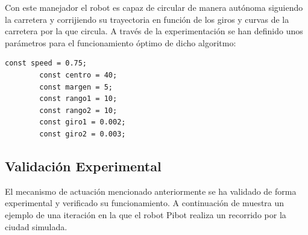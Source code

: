 \documentclass{report}
\begin{document}
Con este manejador el robot es capaz de circular de manera autónoma siguiendo la carretera y corrijiendo su trayectoria en función de los giros y curvas de la carretera por la que circula. A través de la experimentación se han definido unos parámetros para el funcionamiento óptimo de dicho algoritmo:

\begin{lstlisting}[backgroundcolor = \color{light-gray},
				   aboveskip = 2em,
				   belowskip = 2em,
                   xleftmargin = 2cm,
                   framexleftmargin = 1em,
                   basicstyle=\small]
		const speed = 0.75;
		const centro = 40;
		const margen = 5;
		const rango1 = 10;
		const rango2 = 10;
		const giro1 = 0.002;
		const giro2 = 0.003;
\end{lstlisting}
 

\subsection{Validación Experimental}
El mecanismo de actuación mencionado anteriormente se ha validado de forma experimental y verificado su funcionamiento. A continuación de muestra un ejemplo de una iteración en la que el robot Pibot realiza un recorrido por la ciudad simulada.
\end{document}
